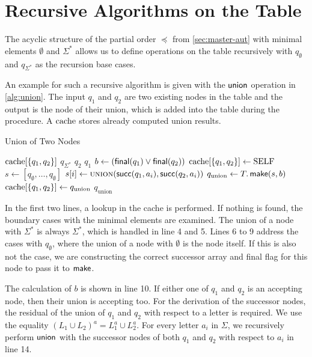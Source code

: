 \section{Recursive Algorithms on the Table}
The acyclic structure of the partial order $\preceq$ from \autoref{sec:master-aut} with minimal elements $\emptyset$ and $\Sigma^{*}$ allows us to define operations on the table recursively with $q_{\emptyset}$ and $q_{\Sigma^{*}}$ as the recursion base cases.
\par
An example for such a recursive algorithm is given with the $\operatorname{\textsf{union}}$ operation in \autoref{alg:union}. The input $q_{1}$ and $q_{2}$ are two existing nodes in the table and the output is the node of their union, which is added into the table during the procedure. A $\mathrm{cache}$ stores already computed union results.
\begin{algorithm}[htb]
\caption{Union of Two Nodes}\label{alg:union}
\begin{algorithmic}[1]
\If{$\cache[\{q_{1},q_{2}\}]$}
	\Return $\cache[\{q_{1},q_{2}\}]$
	\Return $q_{\Sigma^{*}}$
	\Return $q_{2}$
	\Return $q_{1}$
\EndIf
\State $b \gets (\operatorname{\textsf{final}}(q_{1}) \lor \operatorname{\textsf{final}}(q_{2}))$
\State $\mathrm{cache}[\{q_{1},q_{2}\}] \gets \text{SELF}$
\State $s \gets [q_{\emptyset},\dots,q_{\emptyset}]$
\State $s[i] \gets \Call{union}{\Succ(q_{1},a_{i}),\Succ(q_{2},a_{i})}$
\EndFor
\State $q_{\text{union}} \gets T.\operatorname{\textsf{make}}(s,b)$
\State $\mathrm{cache}[\{q_{1},q_{2}\}] \gets q_{\text{union}}$
\Return $q_{\text{union}}$
\EndProcedure
\end{algorithmic}
\end{algorithm}
In the first two lines, a lookup in the cache is performed. If nothing is found, the boundary cases with the minimal elements are examined. The union of a node with $\Sigma^{*}$ is always $\Sigma^{*}$, which is handled in line 4 and 5. Lines 6 to 9 address the cases with $q_{\emptyset}$, where the union of a node with $\emptyset$ is the node itself. 
If this is also not the case, we are constructing the correct successor array and final flag for this node to pass it to $\operatorname{\textsf{make}}$. 

\par 

The calculation of $b$ is shown in line 10. If either one of $q_{1}$ and $q_{2}$ is an accepting node, then their union is accepting too. For the derivation of the successor nodes, the residual of the union of $q_{1}$ and $q_{2}$ with respect to a letter is required. We use the equality $(L_{1} \cup L_{2})^{a} = L_{1}^{a} \cup L_{2}^{a}$. For every letter $a_{i}$ in $\Sigma$, we recursively perform $\operatorname{\textsf{union}}$ with the successor nodes of both $q_{1}$ and $q_{2}$ with respect to $a_{i}$ in line 14.

